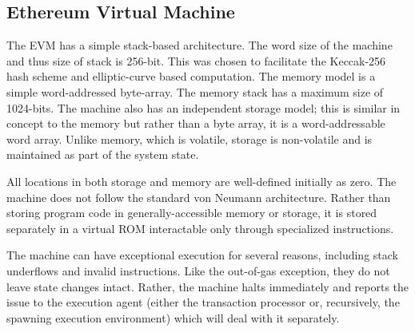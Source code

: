 \documentclass[10pt,letterpaper,leqno,bibliography=totoc]{scrartcl}
\newenvironment{alphafootnotes}
{\par\edef\savedfootnotenumber{\number\value{footnote}}
\renewcommand{\thefootnote}{\alph{footnote}}
\setcounter{footnote}{0}}
{\par\setcounter{footnote}{\savedfootnotenumber}}
\begin{document}
\begin{alphafootnotes}
\begin{multicols*}{2}
		\subsection{Ethereum Virtual Machine}
			The EVM has a simple stack-based architecture. The word size of the machine and thus size of stack is 256-bit. This was chosen to facilitate the Keccak-256 hash scheme and elliptic-curve based computation. The memory model is a simple word-addressed byte-array. The memory stack has a maximum size of 1024-bits. The machine also has an independent storage model; this is similar in concept to the memory but rather than a byte array, it is a word-addressable word array. Unlike memory, which is volatile, storage is non-volatile and is maintained as part of the system state. 

			All locations in both storage and memory are well-defined initially as zero. The machine does not follow the standard von Neumann architecture. Rather than storing program code in generally-accessible memory or storage, it is stored separately in a virtual ROM interactable only through specialized instructions. 
			

			The machine can have exceptional execution for several reasons, including stack underflows and invalid instructions. Like the out-of-gas exception, they do not leave state changes intact. Rather, the machine halts immediately and reports the issue to the execution agent (either the transaction processor or, recursively, the spawning execution environment) which will deal with it separately. 
			
			

\end{multicols*}
\end{alphafootnotes}
\end{document}
